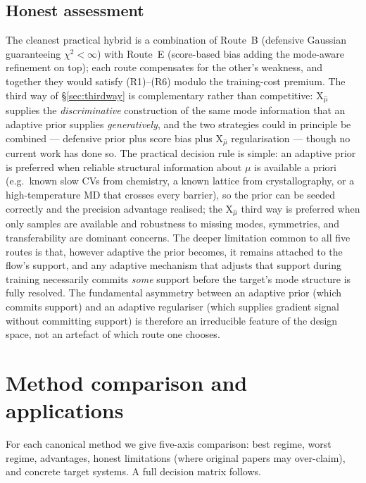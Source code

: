 \documentclass[11pt,letterpaper]{article}
\newcommand{\Xfun}{\mathrm{X}}
\theoremstyle{plain}
\begin{document}
\subsection{Honest assessment}

The cleanest practical hybrid is a combination of Route~B (defensive
Gaussian guaranteeing $\chi^2 < \infty$) with Route~E (score-based bias
adding the mode-aware refinement on top); each route compensates for the
other's weakness, and together they would satisfy (R1)--(R6) modulo the
training-cost premium. The third way of \S\ref{sec:thirdway} is
complementary rather than competitive: $\Xfun_{\hat\mu}$ supplies the
\emph{discriminative} construction of the same mode information that an
adaptive prior supplies \emph{generatively}, and the two strategies could
in principle be combined --- defensive prior plus score bias plus
$\Xfun_{\hat\mu}$ regularisation --- though no current work has done so.
The practical decision rule is simple: an adaptive prior is preferred when
reliable structural information about $\mu$ is available a priori (e.g.\
known slow CVs from chemistry, a known lattice from crystallography, or a
high-temperature MD that crosses every barrier), so the prior can be
seeded correctly and the precision advantage realised; the $\Xfun_{\hat\mu}$
third way is preferred when only samples are available and robustness to
missing modes, symmetries, and transferability are dominant concerns. The
deeper limitation common to all five routes is that, however adaptive the
prior becomes, it remains attached to the flow's support, and any adaptive
mechanism that adjusts that support during training necessarily commits
\emph{some} support before the target's mode structure is fully resolved.
The fundamental asymmetry between an adaptive prior (which commits
support) and an adaptive regulariser (which supplies gradient signal
without committing support) is therefore an irreducible feature of the
design space, not an artefact of which route one chooses.

\section{Method comparison and applications}

\begin{callout}
For each canonical method we give five-axis comparison: best regime, worst regime,
advantages, honest limitations (where original papers may over-claim), and
concrete target systems. A full decision matrix follows.
\end{callout}
\end{document}
